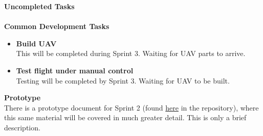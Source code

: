\vspace{5mm}
\noindent\Large{\textbf{Uncompleted Tasks}}\\
\vspace{2mm}\\
\large{\textbf{Common Development Tasks}}
\normalsize
\begin{itemize}
\item \textbf{Build UAV}\\
 This will be completed during Sprint 3. Waiting for UAV parts to arrive.
\item \textbf{Test flight under manual control} \\
 Testing will be completed by Sprint 3. Waiting for UAV to be built.
\end{itemize}


\vspace{6mm}
\noindent\Large{\textbf{Prototype}}\\
\normalsize
There is a prototype document for Sprint 2 (found \href{https://github.com/SDSMT-CSC464-F15/landingpad/tree/master/Documents/Prototypes/Sprint_2}{here} in the repository), where this same material will be covered in much greater detail. This is only a brief description.
